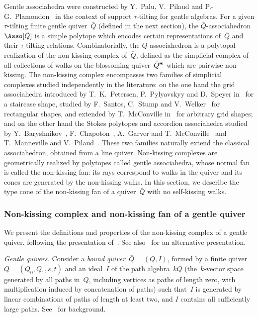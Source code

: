 \documentclass{amsart}
\theoremstyle{definition}
\newcommand{\darkblue}{\color{darkblue}} %
\newcommand{\defn}[1]{\textsl{\darkblue #1}} %
\newcommand{\para}[1]{\medskip\noindent\uline{\textit{#1.}}} %
\newcommand{\quiver}{\bar Q} %
\newcommand{\blossom}{^\text{\ding{96}}} %
\begin{document}
\enlargethispage{-.4cm}
Gentle associahedra were constructed by Y.~Palu, V.~Pilaud and P.-G.~Plamondon~\cite{PaluPilaudPlamondon-nonkissing} in the context of support $\tau$-tilting for gentle algebras.
For a given $\tau$-tilting finite gentle quiver~$\quiver$ (defined in the next section), the $\quiver$-associahedron~$\Asso[\quiver]$ is a simple polytope which encodes certain representations of~$\quiver$ and their $\tau$-tilting relations.
Combinatorially, the $\quiver$-associahedron is a polytopal realization of the non-kissing complex of~$\quiver$, defined as the simplicial complex of all collections of walks on the blossoming quiver~$\quiver\blossom$ which are pairwise non-kissing.
The non-kissing complex encompasses two families of simplicial complexes studied independently in the literature: on the one hand the grid associahedra introduced by T.~K.~Petersen, P.~Pylyavskyy and D.~Speyer in~\cite{PetersenPylyavskyySpeyer} for a staircase shape, studied by F.~Santos, C.~Stump and V.~Welker~\cite{SantosStumpWelker} for rectangular shapes, and extended by T.~McConville in~\cite{McConville} for arbitrary grid shapes; and on the other hand the Stokes polytopes and accordion associahedra studied by Y.~Baryshnikov~\cite{Baryshnikov}, F.~Chapoton~\cite{Chapoton-quadrangulations}, A.~Garver and T.~McConville~\cite{GarverMcConville} and T.~Manneville and V.~Pilaud~\cite{MannevillePilaud-accordion}.
These two families naturally extend the classical associahedron, obtained from a line quiver.
Non-kissing complexes are geometrically realized by polytopes called gentle associahedra, whose normal fan is called the non-kissing fan: its rays correspond to walks in the quiver and its cones are generated by the non-kissing walks.
In this section, we describe the type cone of the non-kissing fan of a quiver~$\quiver$ with no self-kissing walks.


\subsubsection{Non-kissing complex and non-kissing fan of a gentle quiver}
\label{subsubsec:nonkissingComplex}

We present the definitions and properties of the non-kissing complex of a gentle quiver, following the presentation of~\cite{PaluPilaudPlamondon-nonkissing}.
See also~\cite{BrustleDouvilleMousavandThomasYildirim} for an alternative presentation.

\para{Gentle quivers}
%
Consider a \defn{bound quiver}~${\quiver = (Q,I)}$, formed by a finite quiver~$Q = (Q_0, Q_1, s, t)$ and an ideal~$I$ of the path algebra~$kQ$ (the~$k$-vector space generated by all paths in~$Q$, including vertices as paths of length zero, with multiplication induced by concatenation of paths) such that~$I$ is generated by linear combinations of paths of length at least two, and $I$ contains all sufficiently large paths. See~\cite{AssemSimsonSkowronski} for background.
\end{document}
